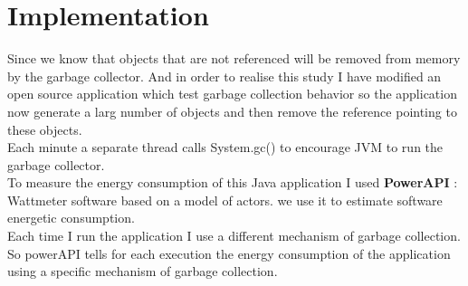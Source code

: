 \section{Implementation}
\label{sec:Implementation}
Since we know that objects that are not referenced will be removed from memory by the garbage collector.
And in order to realise this study I have modified an open source application\cite{GCTest} which test garbage collection behavior so the application now generate a larg number of objects and then remove the reference pointing to these objects.\\
Each minute a separate thread calls System.gc() to encourage JVM to run the garbage collector.\\
To measure the energy consumption of this Java application I used \textbf{PowerAPI}\cite{powerAPI} : Wattmeter software based on a model of actors. we use it to estimate software energetic consumption.\cite{powerAPIFR}\\
Each time I run the application I use a different mechanism of garbage collection. So powerAPI tells for each execution the energy consumption of the application using a specific mechanism of garbage collection.